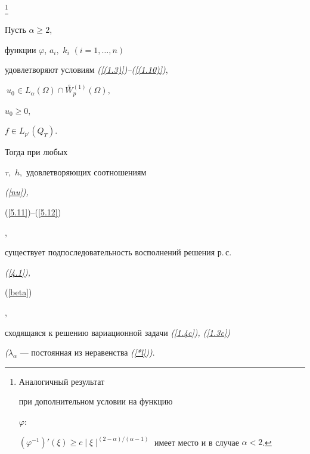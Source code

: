 \begin{thmm}\label{t5.22}


\footnote[1]{


Аналогичный результат 


при дополнительном условии на функцию


$\varphi :$


$ (\varphi^{-1})' (\xi) \ge c


\mid \xi \mid^{(2-\alpha)/(\alpha-1)}$ имеет место и в случае $\alpha < 2$. }


Пусть $\alpha \ge 2$,


функции $\varphi$, $a_i,$ $k_i$ $(i = 1,\dotsc,n) $


удовлетворяют условиям {\em (\ref{(1.3)})--(\ref{(1.10)})},


$\ u_{0} \in L_{\alpha }( \Omega ) \cap \overset\circ W{}^{(1)}_{p} (\Omega),$


$u_{0} \ge 0, $


$ f \in  L_{p'} (Q_T )$.


Тогда при любых


$\tau,$ $h, $ удовлетворяющих соотношениям {\em (\ref{nu}),


(\ref{5.11})--(\ref{5.12})},














существует подпоследовательность восполнений решения р.\,с. {\em (\ref{4.1}),


(\ref{beta})},


сходящаяся к решению вариационной задачи {\em (\ref{1.4c}), (\ref{1.3c})}


{\em (}$\lambda_\alpha $ --- постоянная из неравенства {\em (\ref{*l}))}.


\end{thmm}


